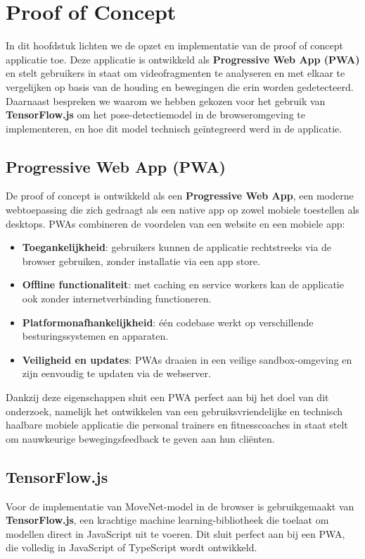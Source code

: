 \chapter{Proof of Concept}
\label{ch:poc}
In dit hoofdstuk lichten we de opzet en implementatie van de proof of concept applicatie toe. 
Deze applicatie is ontwikkeld als \textbf{Progressive Web App (PWA)} en stelt gebruikers in staat om videofragmenten te analyseren en met elkaar te vergelijken op basis van de houding en bewegingen die erin worden gedetecteerd. 
Daarnaast bespreken we waarom we hebben gekozen voor het gebruik van \textbf{TensorFlow.js} om het pose-detectiemodel in de browseromgeving te implementeren, en hoe dit model technisch geïntegreerd werd in de applicatie.

\section{Progressive Web App (PWA)}
De proof of concept is ontwikkeld als een \textbf{Progressive Web App}, een moderne webtoepassing die zich gedraagt als een native app op zowel mobiele toestellen als desktops. 
PWAs combineren de voordelen van een website en een mobiele app:
\begin{itemize}
    \item \textbf{Toegankelijkheid}: gebruikers kunnen de applicatie rechtstreeks via de browser gebruiken, zonder installatie via een app store.
    \item \textbf{Offline functionaliteit}: met caching en service workers kan de applicatie ook zonder internetverbinding functioneren.
    \item \textbf{Platformonafhankelijkheid}: één codebase werkt op verschillende besturingssystemen en apparaten.
    \item \textbf{Veiligheid en updates}: PWAs draaien in een veilige sandbox-omgeving en zijn eenvoudig te updaten via de webserver.
\end{itemize}

Dankzij deze eigenschappen sluit een PWA perfect aan bij het doel van dit onderzoek, namelijk het ontwikkelen van een gebruiksvriendelijke en technisch haalbare mobiele applicatie die personal trainers en fitnesscoaches in staat stelt om nauwkeurige bewegingsfeedback te geven aan hun cliënten.

\section{TensorFlow.js}
Voor de implementatie van MoveNet-model in de browser is gebruikgemaakt van \textbf{TensorFlow.js}, een krachtige machine learning-bibliotheek die toelaat om modellen direct in JavaScript uit te voeren. 
Dit sluit perfect aan bij een PWA, die volledig in JavaScript of TypeScript wordt ontwikkeld.

